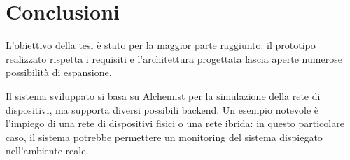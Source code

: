 \section{Conclusioni}

  \begin{frame}{\insertsectionhead}
    L'obiettivo della tesi è stato per la maggior parte raggiunto:
    il prototipo realizzato rispetta i requisiti e l'architettura progettata lascia aperte numerose possibilità di espansione.

    \bigskip

    Il sistema sviluppato si basa su Alchemist per la simulazione della rete di dispositivi, ma supporta diversi possibili backend.
    Un esempio notevole è l'impiego di una rete di dispositivi fisici o una rete ibrida:
    in questo particolare caso, il sistema potrebbe permettere un monitoring del sistema dispiegato nell'ambiente reale.
  \end{frame}
